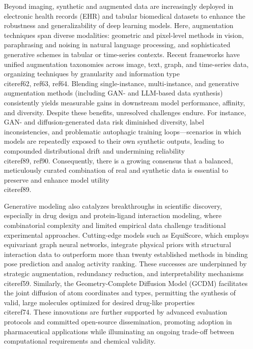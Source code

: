 \documentclass[11pt]{article}
\begin{document}
Beyond imaging, synthetic and augmented data are increasingly deployed in electronic health records (EHR) and tabular biomedical datasets to enhance the robustness and generalizability of deep learning models. Here, augmentation techniques span diverse modalities: geometric and pixel-level methods in vision, paraphrasing and noising in natural language processing, and sophisticated generative schemes in tabular or time-series contexts. Recent frameworks have unified augmentation taxonomies across image, text, graph, and time-series data, organizing techniques by granularity and information type~\\cite{ref62, ref63, ref64}. Blending single-instance, multi-instance, and generative augmentation methods (including GAN- and LLM-based data synthesis) consistently yields measurable gains in downstream model performance, affinity, and diversity. Despite these benefits, unresolved challenges endure. For instance, GAN- and diffusion-generated data risk diminished diversity, label inconsistencies, and problematic autophagic training loops—scenarios in which models are repeatedly exposed to their own synthetic outputs, leading to compounded distributional drift and undermining reliability~\\cite{ref89, ref90}. Consequently, there is a growing consensus that a balanced, meticulously curated combination of real and synthetic data is essential to preserve and enhance model utility~\\cite{ref89}.

Generative modeling also catalyzes breakthroughs in scientific discovery, especially in drug design and protein-ligand interaction modeling, where combinatorial complexity and limited empirical data challenge traditional experimental approaches. Cutting-edge models such as EquiScore, which employs equivariant graph neural networks, integrate physical priors with structural interaction data to outperform more than twenty established methods in binding pose prediction and analog activity ranking. These successes are underpinned by strategic augmentation, redundancy reduction, and interpretability mechanisms~\\cite{ref59}. Similarly, the Geometry-Complete Diffusion Model (GCDM) facilitates the joint diffusion of atom coordinates and types, permitting the synthesis of valid, large molecules optimized for desired drug-like properties~\\cite{ref74}. These innovations are further supported by advanced evaluation protocols and committed open-source dissemination, promoting adoption in pharmaceutical applications while illuminating an ongoing trade-off between computational requirements and chemical validity.
\end{document}
